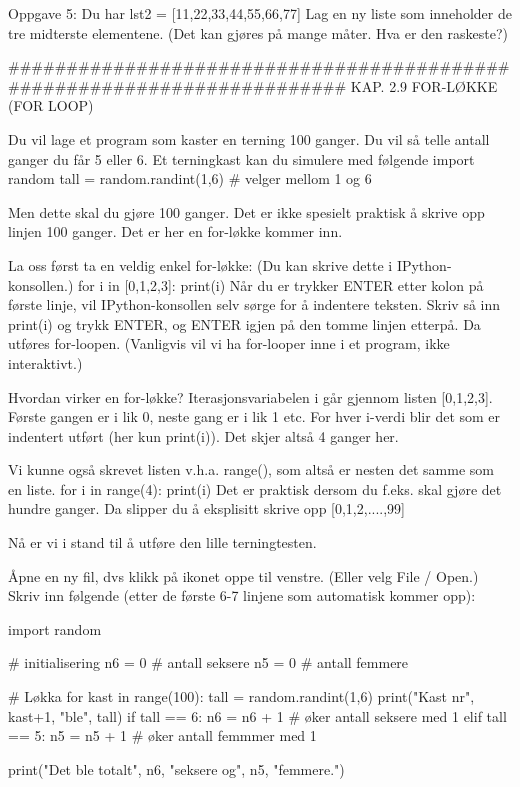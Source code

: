 Oppgave 5: Du har lst2 = [11,22,33,44,55,66,77]
Lag en ny liste som inneholder de tre midterste elementene.
(Det kan gjøres på mange måter. Hva er den raskeste?)

######################################################################## 
KAP. 2.9  FOR-LØKKE (FOR LOOP)

Du vil lage et program som kaster en terning 100 ganger.
Du vil så telle antall ganger du får 5 eller 6. 
Et terningkast kan du simulere med følgende 
import random
tall = random.randint(1,6)   # velger mellom 1 og 6

Men dette skal du gjøre 100 ganger.
Det er ikke spesielt praktisk å skrive opp linjen 100 ganger.
Det er her en for-løkke kommer inn. 

La oss først ta en veldig enkel for-løkke:
(Du kan skrive dette i IPython-konsollen.) 
for i in [0,1,2,3]:
    print(i)
Når du er trykker ENTER etter kolon på første linje,
vil IPython-konsollen selv sørge for å indentere teksten.
Skriv så inn print(i) og trykk ENTER, og ENTER igjen på den tomme linjen etterpå.
Da utføres for-loopen.
(Vanligvis vil vi ha for-looper inne i et program, ikke interaktivt.) 

Hvordan virker en for-løkke?
Iterasjonsvariabelen i går gjennom listen [0,1,2,3]. 
Første gangen er i lik 0, neste gang er i lik 1 etc.
For hver i-verdi blir det som er indentert utført (her kun print(i)).
Det skjer altså 4 ganger her. 

Vi kunne også skrevet listen v.h.a. range(), som altså er nesten det samme som en liste. 
for i in range(4): 
    print(i) 
Det er praktisk dersom du f.eks. skal gjøre det hundre ganger.
Da slipper du å eksplisitt skrive opp [0,1,2,....,99]


Nå er vi i stand til å utføre den lille terningtesten. 

Åpne en ny fil, dvs klikk på ikonet oppe til venstre. (Eller velg File / Open.)
Skriv inn følgende (etter de første 6-7 linjene som automatisk kommer opp): 

import random

# initialisering
n6 = 0  # antall seksere
n5 = 0  # antall femmere

# Løkka 
for kast in range(100):
    tall = random.randint(1,6)
    print("Kast nr", kast+1, "ble", tall)
    if tall == 6:
       n6 = n6 + 1    # øker antall seksere med 1
    elif tall == 5:
       n5 = n5 + 1    # øker antall femmmer med 1

print("Det ble totalt", n6, "seksere og", n5, "femmere.")


